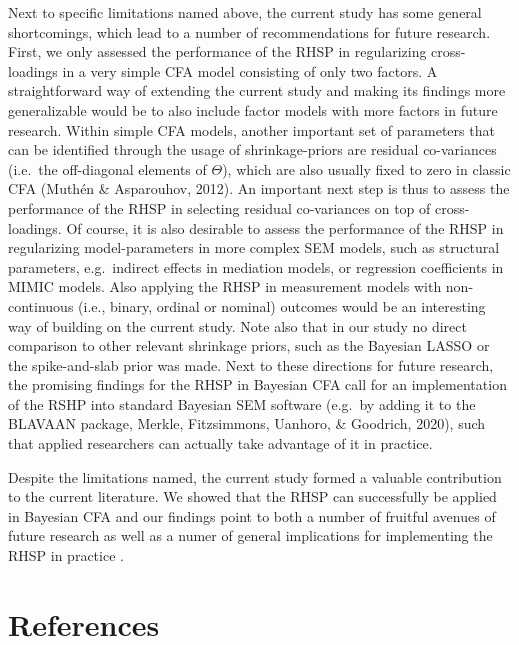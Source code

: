 \documentclass[
  man, donotrepeattitle,floatsintext]{apa6}
\begin{document}
Next to specific limitations named above, the current study has some general shortcomings, which lead to a number of recommendations for future research. First, we only assessed the performance of the RHSP in regularizing cross-loadings in a very simple CFA model consisting of only two factors. A straightforward way of extending the current study and making its findings more generalizable would be to also include factor models with more factors in future research. Within simple CFA models, another important set of parameters that can be identified through the usage of shrinkage-priors are residual co-variances (i.e.~the off-diagonal elements of \(\Theta\)), which are also usually fixed to zero in classic CFA (Muthén \& Asparouhov, 2012). An important next step is thus to assess the performance of the RHSP in selecting residual co-variances on top of cross-loadings. Of course, it is also desirable to assess the performance of the RHSP in regularizing model-parameters in more complex SEM models, such as structural parameters, e.g.~indirect effects in mediation models, or regression coefficients in MIMIC models. Also applying the RHSP in measurement models with non-continuous (i.e., binary, ordinal or nominal) outcomes would be an interesting way of building on the current study. Note also that in our study no direct comparison to other relevant shrinkage priors, such as the Bayesian LASSO or the spike-and-slab prior was made. Next to these directions for future research, the promising findings for the RHSP in Bayesian CFA call for an implementation of the RSHP into standard Bayesian SEM software (e.g.~by adding it to the BLAVAAN package, Merkle, Fitzsimmons, Uanhoro, \& Goodrich, 2020), such that applied researchers can actually take advantage of it in practice.

Despite the limitations named, the current study formed a valuable contribution to the current literature. We showed that the RHSP can successfully be applied in Bayesian CFA and our findings point to both a number of fruitful avenues of future research as well as a numer of general implications for implementing the RHSP in practice .

\clearpage

\hypertarget{references}{%
\section{References}\label{references}}

\begingroup
\setlength{\parindent}{-0.5in}
\setlength{\leftskip}{0.5in}
\end{document}
